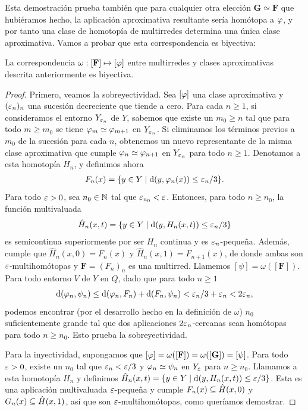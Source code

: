 Esta demostración prueba también que para cualquier otra elección $ \mathbf{G} \simeq \mathbf{F}$ que hubiéramos hecho, la aplicación aproximativa resultante sería homótopa a $ \varphi  $, y por tanto una clase de homotopía de multirredes determina una única clase aproximativa. Vamos a probar que esta correspondencia es biyectiva:
\begin{theorem}
  La correspondencia $ \omega: [\mathbf{F }]\mapsto[ \varphi]  $ entre multirredes y clases aproximativas descrita anteriormente es biyectiva.
\end{theorem}
\begin{proof}
  Primero, veamos la sobreyectividad. Sea $ [\varphi]$ una clase aproximativa y $ (\varepsilon_n)_n  $ una sucesión decreciente que tiende a cero. Para cada $ n\geq 1 $, si consideramos el entorno $ Y_{\varepsilon_n } $ de $ Y  $, sabemos que existe un $ m_0\geq n$ tal que para todo $ m\geq m_0  $ se tiene $ \varphi_m \simeq \varphi_{m+1} $ en $ Y_{\varepsilon_n } $. Si eliminamos los términos previos a  $ m_0 $ de la sucesión para cada $ n  $, obtenemos un nuevo representante de la misma clase aproximativa que cumple $ \varphi_n\simeq \varphi_{n+1}  $ en $ Y_{\varepsilon_n } $ para todo $ n\geq 1 $. Denotamos a esta homotopía $ H_n  $, y definimos ahora 
  \begin{gather*}
    F_n (x) = \{y\in Y\mid \dd(y,\varphi_n(x))\leq \varepsilon_n/3 \}.
  \end{gather*}
  Para todo $ \varepsilon>0  $, sea $ n_0 \in \mathbb{N}  $ tal que  $ \varepsilon_{n_0}<\varepsilon  $. Entonces, para todo $ n\geq n_0  $, la función multivaluada 
  \begin{gather*}
    \hat{H}_n(x,t)  = \{y\in Y\mid \dd(y,H_n(x,t))\leq \varepsilon_n/3 \}
  \end{gather*}
  es semicontinua superiormente por ser $ H_n $ continua y es $ \varepsilon_n  $-peque\~na. Además, cumple que $ \hat{H}_n(x,0) = F_n(x) $ y $ \hat{H}_n(x,1) = F_{n+1}(x) $, de donde ambas son $ \varepsilon $-multihomótopas y $ \mathbf{F} = (F_n)_n  $ es una multirred. Llamemos $ [\psi ]= \omega([\mathbf{F }]) $. Para todo entorno $ V $ de $ Y  $ en $ Q  $, dado que para todo $ n\geq 1 $ 
  \begin{gather*}
    \dd(\varphi_n,\psi_n)\leq \dd(\varphi_n,F_n)+\dd(F_n,\psi_n) <\varepsilon_n/3+\varepsilon_n <2\varepsilon_n,
  \end{gather*}
  podemos encontrar (por el desarrollo hecho en la definición de $ \omega  $) $ n_0 $ suficientemente grande tal que dos aplicaciones $ 2\varepsilon_n $-cercanas sean homótopas para todo $ n\geq n_0 $. Esto prueba la sobreyectividad.


  Para la inyectividad, supongamos que $ [\varphi]  = \omega([\mathbf{F}]) = \omega([\mathbf{G}])  = [\psi ]$. Para todo $ \varepsilon>0  $, existe un $ n_0  $ tal que $ \varepsilon_n<\varepsilon/3  $ y  $ \varphi_n \simeq \psi_n  $ en $ Y_{\varepsilon}$ para $ n\geq n_0 $. Llamamos a esta homotopía $ H_n  $ y definimos $ \hat{H}_n(x,t) = \{y\in Y\mid \dd(y,H_n(x,t))\leq \varepsilon/3 \}$. Esta es una aplicación multivaluada $ \varepsilon  $-peque\~na y cumple $ F_n(x)\subseteq \hat{H}(x,0) $ y $ G_n(x)\subseteq \hat{H}(x,1) $, así que son $ \varepsilon  $-multihomótopas, como queríamos demostrar.
\end{proof}

